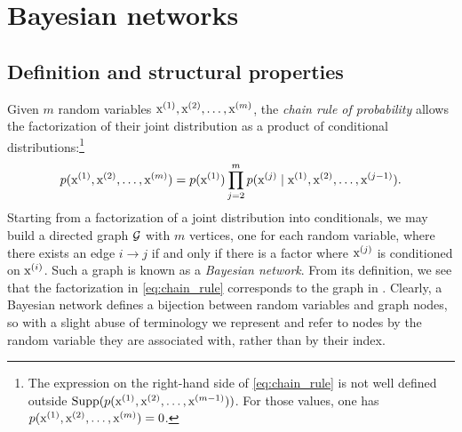 \section{Bayesian networks}
\label{sec:bayesian_networks}

\subsection{Definition and structural properties}
\label{sec:bayesian_net_definition}

Given $m$ random variables ${\textnormal{x}}^{(1)},{\textnormal{x}}^{(2)},\dots,{\textnormal{x}}^{(m)}$, the \emph{chain rule of probability} allows the factorization of their joint distribution as a product of conditional distributions:\footnote{The expression on the right-hand side of \eqref{eq:chain_rule} is not well defined outside $\mathrm{Supp}(p({\textnormal{x}}^{(1)}, {\textnormal{x}}^{(2)}, \dots, {\textnormal{x}}^{(m-1)}))$. For those values, one has $p({\textnormal{x}}^{(1)}, {\textnormal{x}}^{(2)}, \dots, {\textnormal{x}}^{(m)})=0$.}
\begin{equation}
    \label{eq:chain_rule}
    p({\textnormal{x}}^{(1)},{\textnormal{x}}^{(2)},\dots,{\textnormal{x}}^{(m)}) = p({\textnormal{x}}^{(1)}) \prod_{j=2}^m p({\textnormal{x}}^{(j)} \mid {\textnormal{x}}^{(1)}, {\textnormal{x}}^{(2)}, \dots, {\textnormal{x}}^{(j-1)}).
\end{equation}
Starting from a factorization of a joint distribution into conditionals, we may build a directed graph ${\mathcal{G}}$ with $m$ vertices, one for each random variable, where there exists an edge $i \rightarrow j$ if and only if there is a factor where ${\textnormal{x}}^{(j)}$ is conditioned on ${\textnormal{x}}^{(i)}$. Such a graph is known as a \emph{Bayesian network}. From its definition, we see that the factorization in \eqref{eq:chain_rule} corresponds to the graph in . Clearly, a Bayesian network defines a bijection between random variables and graph nodes, so with a slight abuse of terminology we represent and refer to nodes by the random variable they are associated with, rather than by their index.

